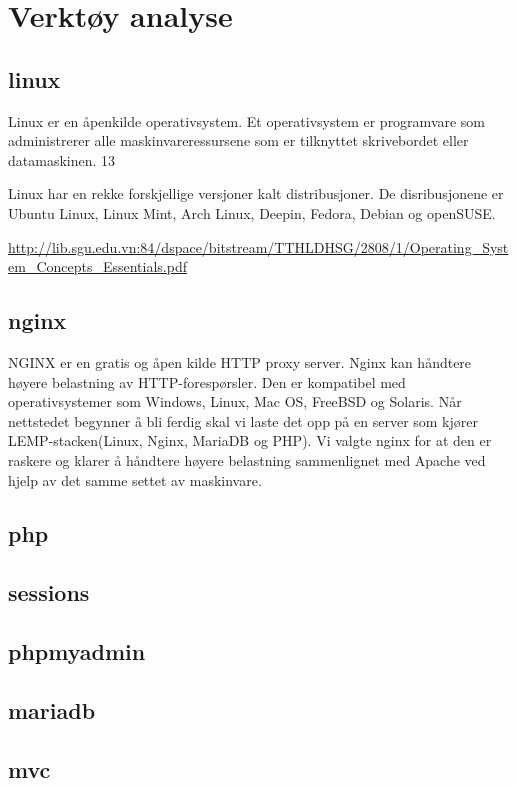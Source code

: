 \clearpage

\section{Verktøy analyse}


\subsection{linux}
Linux er en åpenkilde operativsystem. Et operativsystem er programvare som administrerer alle maskinvareressursene som er tilknyttet skrivebordet eller datamaskinen. 
13

Linux har en rekke forskjellige versjoner kalt distribusjoner. De disribusjonene er Ubuntu Linux, Linux Mint, Arch Linux, Deepin, Fedora, Debian og openSUSE.

\url{http://lib.sgu.edu.vn:84/dspace/bitstream/TTHLDHSG/2808/1/Operating_System_Concepts_Essentials.pdf}

\subsection{nginx}
NGINX er en gratis og åpen kilde HTTP proxy server. Nginx kan håndtere høyere belastning av HTTP-forespørsler. Den er kompatibel med operativsystemer som Windows, Linux, Mac OS, FreeBSD og Solaris.
Når nettstedet begynner å bli ferdig skal vi laste det opp på en server som kjører LEMP-stacken(Linux, Nginx, MariaDB og PHP).
Vi valgte nginx for at den er raskere og klarer å håndtere høyere belastning sammenlignet med Apache ved hjelp av det samme settet av maskinvare.


\subsection{php}
\subsection{sessions}
\subsection{phpmyadmin}
\subsection{mariadb}
\subsection{mvc}
